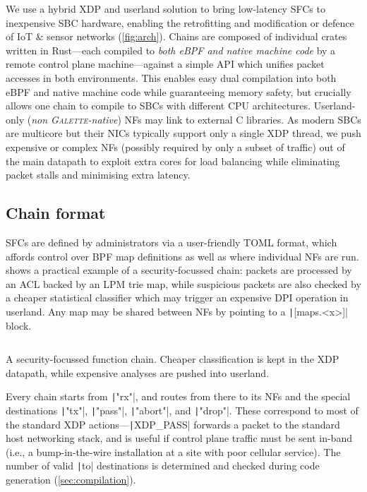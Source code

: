 \documentclass[comsoc, conference, times]{IEEEtran}
\newcommand{\ourtech}{\textsc{Galette}}
\begin{document}
We use a hybrid XDP and userland solution to bring low-latency SFCs to inexpensive SBC hardware, enabling the retrofitting and modification or defence of IoT \& sensor networks (\cref{fig:arch}).
Chains are composed of individual crates written in Rust---each compiled to \emph{both eBPF and native machine code} by a remote control plane machine---against a simple API which unifies packet accesses in both environments.
This enables easy dual compilation into both eBPF and native machine code while guaranteeing memory safety, but crucially allows one chain to compile to SBCs with different CPU architectures.
Userland-only (\emph{non \ourtech-native}) NFs may link to external C libraries.
As modern SBCs are multicore but their NICs typically support only a single XDP thread, we push expensive or complex NFs (possibly required by only a subset of traffic) out of the main datapath to exploit extra cores for load balancing while eliminating packet stalls and minimising extra latency.

\subsection{Chain format}\label{sec:design:chain}
SFCs are defined by administrators via a user-friendly TOML format, which affords control over BPF map definitions as well as where individual NFs are run.
 shows a practical example of a security-focussed chain: packets are processed by an ACL backed by an LPM trie map, while suspicious packets are also checked by a cheaper statistical classifier which may trigger an expensive DPI operation in userland.
Any map may be shared between NFs by pointing to a \texttt|[maps.<x>]| block.

\begin{listing}
	\centering
	\inputminted[fontsize=\footnotesize]{toml}{listings/security.toml}
	\caption{A security-focussed function chain. Cheaper classification is kept in the XDP datapath, while expensive analyses are pushed into userland.\label{listing:chain-sec}}
\end{listing}

Every chain starts from \texttt|"rx"|, and routes from there to its NFs and the special destinations \texttt|"tx"|, \texttt|"pass"|, \texttt|"abort"|, and \texttt|"drop"|.
These correspond to most of the standard XDP actions---\texttt|XDP_PASS| forwards a packet to the standard host networking stack, and is useful if control plane traffic must be sent in-band (i.e., a bump-in-the-wire installation at a site with poor cellular service).
The number of valid \texttt|to| destinations is determined and checked during code generation (\cref{sec:compilation}).
\end{document}
